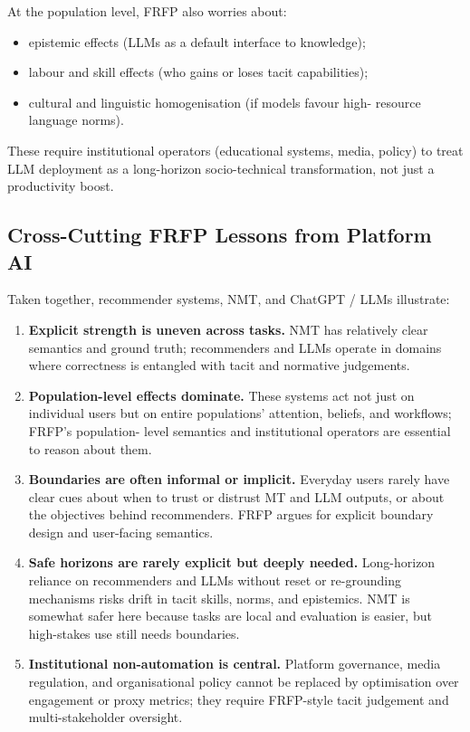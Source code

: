 At the population level, FRFP also worries about:

\begin{itemize}
\item epistemic effects (LLMs as a default interface to knowledge);
\item labour and skill effects (who gains or loses tacit capabilities);
\item cultural and linguistic homogenisation (if models favour high-
resource language norms).
\end{itemize}

These require institutional operators (educational systems, media, policy)
to treat LLM deployment as a long-horizon socio-technical transformation,
not just a productivity boost.

\subsection{Cross-Cutting FRFP Lessons from Platform AI}

Taken together, recommender systems, NMT, and ChatGPT / LLMs illustrate:

\begin{enumerate}
\item \textbf{Explicit strength is uneven across tasks.}
NMT has relatively clear semantics and ground truth; recommenders
and LLMs operate in domains where correctness is entangled with
tacit and normative judgements.

\item \textbf{Population-level effects dominate.}
These systems act not just on individual users but on entire
populations’ attention, beliefs, and workflows; FRFP’s population-
level semantics and institutional operators are essential to reason
about them.

\item \textbf{Boundaries are often informal or implicit.}
Everyday users rarely have clear cues about when to trust or distrust
MT and LLM outputs, or about the objectives behind recommenders.
FRFP argues for explicit boundary design and user-facing semantics.

\item \textbf{Safe horizons are rarely explicit but deeply needed.}
Long-horizon reliance on recommenders and LLMs without reset or
re-grounding mechanisms risks drift in tacit skills, norms, and
epistemics.
NMT is somewhat safer here because tasks are local and evaluation is
easier, but high-stakes use still needs boundaries.

\item \textbf{Institutional non-automation is central.}
Platform governance, media regulation, and organisational policy
cannot be replaced by optimisation over engagement or proxy metrics;
they require FRFP-style tacit judgement and multi-stakeholder
oversight.
\end{enumerate}

